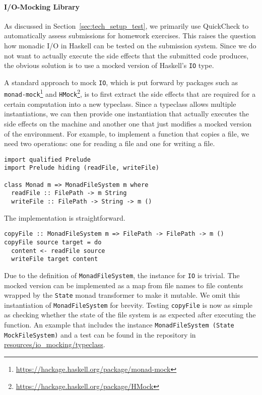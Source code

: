 \paragraph{I/O-Mocking Library}
As discussed in Section~\ref{sec:tech_setup_test}, we primarily use QuickCheck to automatically assess submissions for homework exercises.
This raises the question how monadic I/O in Haskell can be tested on the submission system.
Since we do not want to actually execute the side effects that the submitted code produces,
the obvious solution is to use a mocked version of Haskell's \texttt{IO} type.

A standard approach to mock \texttt{IO}, which is put forward by packages such as \texttt{monad-mock}\footnote{\url{https://hackage.haskell.org/package/monad-mock}} and \texttt{HMock}\footnote{\url{https://hackage.haskell.org/package/HMock}}, is to first extract the side effects that are required for a certain computation into a new typeclass.
Since a typeclass allows multiple instantiations,
we can then provide one instantiation that actually executes the side effects on the machine
and another one that just modifies a mocked version of the environment.
For example, to implement a function that copies a file,
we need two operations:
one for reading a file and one for writing a file.
\begin{verbatim}
import qualified Prelude
import Prelude hiding (readFile, writeFile)

class Monad m => MonadFileSystem m where
  readFile :: FilePath -> m String
  writeFile :: FilePath -> String -> m ()
\end{verbatim}
The implementation is straightforward.
\begin{verbatim}
copyFile :: MonadFileSystem m => FilePath -> FilePath -> m ()
copyFile source target = do
  content <- readFile source
  writeFile target content
\end{verbatim}
Due to the definition of \texttt{MonadFileSystem}, the instance for \texttt{IO} is trivial.
The mocked version can be implemented as a map from file names to file contents wrapped by the \texttt{State} monad transformer to make it mutable.
We omit this instantiation of \texttt{MonadFileSystem} for brevity.
Testing \texttt{copyFile} is now as simple as checking whether the state of the file system is as expected after executing the function.
An example that includes the instance \texttt{MonadFileSystem (State MockFileSystem)} and a test can be found in the repository in \href{https://github.com/kappelmann/engaging-large-scale-functional-programming/tree/main/resources/io_mocking/typeclass}{resources/io\_mocking/typeclass}.
